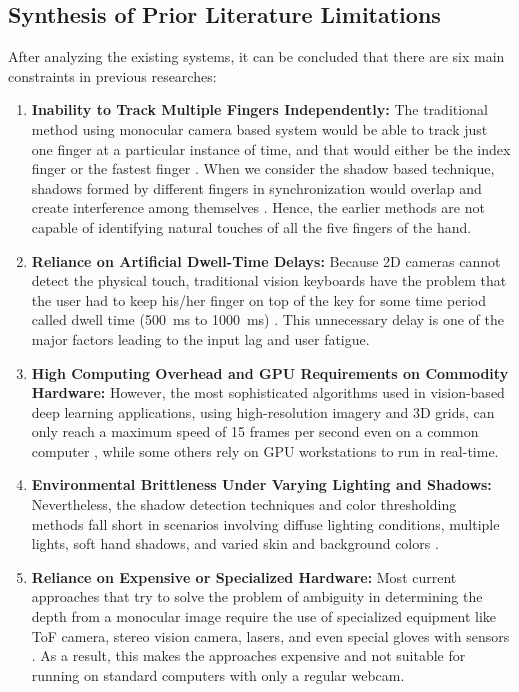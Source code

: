 \subsection{Synthesis of Prior Literature Limitations}
After analyzing the existing systems, it can be concluded that there are six main constraints in previous researches:
\begin{enumerate}
    \item \textbf{Inability to Track Multiple Fingers Independently:} The traditional method using monocular camera based system would be able to track just one finger at a particular instance of time, and that would either be the index finger or the fastest finger \cite{Thomas2013Camera, Ji2018Local, Srivastava2012RealTime}. When we consider the shadow based technique, shadows formed by different fingers in synchronization would overlap and create interference among themselves \cite{Posner2012Single}. Hence, the earlier methods are not capable of identifying natural touches of all the five fingers of the hand.
    \item \textbf{Reliance on Artificial Dwell-Time Delays:} Because 2D cameras cannot detect the physical touch, traditional vision keyboards have the problem that the user had to keep his/her finger on top of the key for some time period called dwell time (500~ms to 1000~ms) \cite{Khare2019QWERTY, Chen2024Gaze}. This unnecessary delay is one of the major factors leading to the input lag and user fatigue.
    \item \textbf{High Computing Overhead and GPU Requirements on Commodity Hardware:} However, the most sophisticated algorithms used in vision-based deep learning applications, using high-resolution imagery and 3D grids, can only reach a maximum speed of 15 frames per second even on a common computer \cite{Enkhbat2020HandKey, Ji2018Local}, while some others rely on GPU workstations to run in real-time.
    \item \textbf{Environmental Brittleness Under Varying Lighting and Shadows:} Nevertheless, the shadow detection techniques and color thresholding methods fall short in scenarios involving diffuse lighting conditions, multiple lights, soft hand shadows, and varied skin and background colors \cite{Thomas2013Camera, Yue2014Blind, ReviewVirtualKeyboard2020}.
    \item \textbf{Reliance on Expensive or Specialized Hardware:} Most current approaches that try to solve the problem of ambiguity in determining the depth from a monocular image require the use of specialized equipment like ToF camera, stereo vision camera, lasers, and even special gloves with sensors \cite{Lee2019Virtual, Kudale2016RealTime, Toshpulatov2024RealTime, Pilkov2024Markerless}. As a result, this makes the approaches expensive and not suitable for running on standard computers with only a regular webcam.

\end{enumerate}
